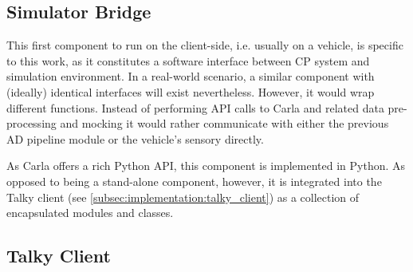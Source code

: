 \subsection{Simulator Bridge}
\label{subsec:implementation:simulator_bridge}
This first component to run on the client-side, i.e. usually on a vehicle, is specific to this work, as it constitutes a software interface between CP system and simulation environment. In a real-world scenario, a similar component with (ideally) identical interfaces will exist nevertheless. However, it would wrap different functions. Instead of performing API calls to Carla and related data pre-processing and mocking it would rather communicate with either the previous AD pipeline module or the vehicle's sensory directly. 

As Carla offers a rich Python API, this component is implemented in Python. As opposed to being a stand-alone component, however, it is integrated into the Talky client (see \autoref{subsec:implementation:talky_client}) as a collection of encapsulated modules and classes.

\subsection{Talky Client}
\label{subsec:implementation:talky_client}